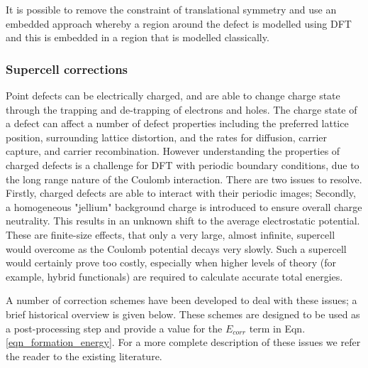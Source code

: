 It is possible to remove the constraint of translational symmetry and use an embedded approach whereby a region around the defect is modelled using DFT and this is embedded in a region that is modelled classically.


\subsubsection{Supercell corrections}
Point defects can be electrically charged, and are able to change charge state through the trapping and de-trapping of electrons and holes. 
The charge state of a defect can affect a number of defect properties including the preferred lattice position, surrounding lattice distortion, and the rates for diffusion, carrier capture, and carrier recombination.
However understanding the properties of charged defects is a challenge for DFT with periodic boundary conditions, due to the long range nature of the Coulomb interaction.
There are two issues to resolve. 
Firstly, charged defects are able to interact with their periodic images; 
Secondly, a homogeneous "jellium" background charge is introduced to ensure overall charge neutrality. This results in an unknown shift to the average electrostatic potential. 
These are finite-size effects, that only a very large, almost infinite, supercell would overcome as the Coulomb potential decays very slowly.
Such a supercell would certainly prove too costly, especially when higher levels of theory (for example, hybrid functionals) are required to calculate accurate total energies.

A number of correction schemes have been developed to deal with these issues; a brief historical overview is given below. These schemes are designed to be used as a post-processing step and provide a value for the $E_{corr}$ term in Eqn.\ref{eqn_formation_energy}. For a more complete description of these issues we refer the reader to the existing literature.\cite{durrant2018,Vinichenko2017}

